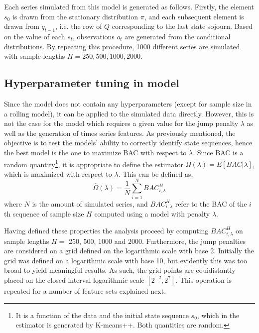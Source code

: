 Each series simulated from this model is generated as follows. Firstly, the element $s_0$ is drawn from the stationary distribution $\pi$, and each subsequent element is drawn from $q_{t-1}$, i.e. the row of $Q$ corresponding to the last state sojourn. Based on the value of each $s_t$, observations $o_t$ are generated from the conditional distributions. By repeating this procedure, 1000 different series are simulated with sample lengths $H = 250, 500, 1000, 2000$.

\subsection{Hyperparameter tuning in \jump model}
\label{subsection: jump_penalizer}
Since the \mle model does not contain any hyperparameters (except for sample size in a rolling model), it can be applied to the simulated data directly. However, this is not the case for the \jump model which requires a given value for the jump penalty $\lambda$ as well as the generation of times series features. As previously mentioned, the objective is to test the models' ability to correctly identify state sequences, hence the best \jump model is the one to maximize BAC with respect to $\lambda$. Since BAC is a random quantity\footnote
{It is a function of the data and the initial state sequence $s_0$, which in the \jump estimator is generated by K-means++. Both quantities are random.},
it is appropriate to define the estimator $\Omega(\lambda)= E[BAC|\lambda]$, which is maximized with respect to $\lambda$. This can be defined as, 
\begin{equation}
    \hat\Omega(\lambda) = \frac{1}{N} \sum_{i=1}^N BAC_{i, \lambda}^H
\end{equation}
where $N$ is the amount of simulated series, and $BAC_{i, \lambda}^H$ refer to the BAC of the $i$th sequence of sample size $H$ computed using a \jump model with penalty $\lambda$.

Having defined these properties the analysis proceed by computing $BAC_{i, \lambda}^H$ on sample lengths $H =$ 250, 500, 1000 and 2000. Furthermore, the jump penalties are considered on a grid defined on the logarithmic scale with base 2. Initially the grid was defined on a logarithmic scale with base 10, but evidently this was too broad to yield meaningful results. As such, the grid points are equidistantly placed on the closed interval logarithmic scale $[2^{-2}, 2^{7}]$. This operation is repeated for a number of feature sets explained next.


